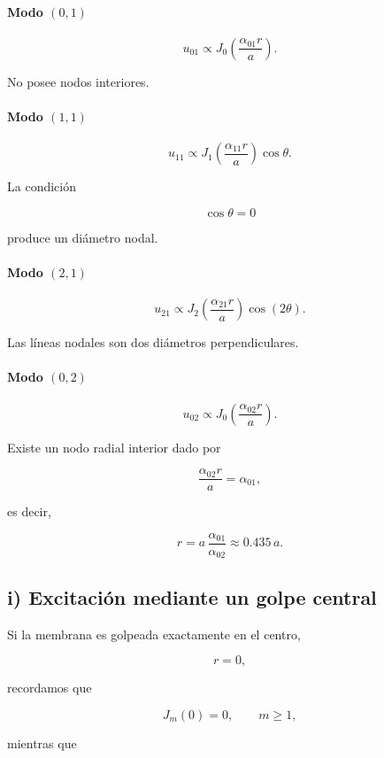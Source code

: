\documentclass[11pt,spanish]{article}
\begin{document}
\paragraph{Modo $(0,1)$}

\[
u_{01}
\propto
J_0\!\left(
\frac{\alpha_{01}r}{a}
\right).
\]

No posee nodos interiores.

\paragraph{Modo $(1,1)$}

\[
u_{11}
\propto
J_1\!\left(
\frac{\alpha_{11}r}{a}
\right)
\cos\theta.
\]

La condición

\[
\cos\theta=0
\]

produce un diámetro nodal.

\paragraph{Modo $(2,1)$}

\[
u_{21}
\propto
J_2\!\left(
\frac{\alpha_{21}r}{a}
\right)
\cos(2\theta).
\]

Las líneas nodales son dos diámetros perpendiculares.

\paragraph{Modo $(0,2)$}

\[
u_{02}
\propto
J_0\!\left(
\frac{\alpha_{02}r}{a}
\right).
\]

Existe un nodo radial interior dado por

\[
\frac{\alpha_{02}r}{a}
=
\alpha_{01},
\]

es decir,

\[
r
=
a\,
\frac{\alpha_{01}}{\alpha_{02}}
\approx
0.435\,a.
\]

\subsection*{i) Excitación mediante un golpe central}

Si la membrana es golpeada exactamente en el centro,

\[
r=0,
\]

recordamos que

\[
J_m(0)=0,
\qquad m\ge 1,
\]

mientras que
\end{document}
